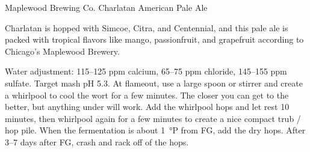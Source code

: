 \begin{recipie}{Maplewood Brewing Co. Charlatan American Pale Ale}

\begin{aboutblock}
Charlatan is hopped with Simcoe, Citra, and Centennial, and this pale ale is packed
with tropical flavors like mango, passionfruit, and grapefruit according to Chicago's
Maplewood Brewery.
\end{aboutblock}


\begin{methodandtiming}
 
\begin{mashsteps}
\end{mashsteps}

\begin{directions}
Water adjustment: 115--125 ppm calcium, 65--75 ppm chloride, 145--155 ppm sulfate.
Target mash pH 5.3. At flameout, use a large spoon or stirrer and create a whirlpool
to cool the wort for a few minutes. The closer you can get to  the better,
but anything under  will work. Add the whirlpool hops and let rest 10
minutes, then whirlpool again for a few minutes to create a nice compact trub / hop
pile. When the fermentation is about 1~°P from FG, add the dry hops. After 3--7 days
after FG, crash and rack off of the hops.
\end{directions}

\end{methodandtiming}

\pagebreak

\begin{ingredientsblock}

\begin{malts}
\end{malts}

\begin{hops}
\end{hops}


\end{ingredientsblock}
\end{recipie}
